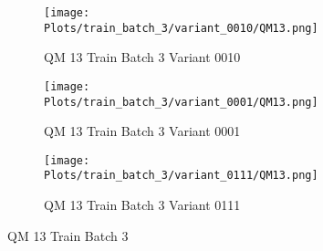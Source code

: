 \documentclass{DissertateFigs}
\begin{document}
\begin{figure}[t!]
\medskip

    \begin{subfigure}{0.47\textwidth}
    \texttt{[image: Plots/train\_batch\_3/variant\_0010/QM13.png]}
    \caption{QM 13 Train Batch 3 Variant 0010}
    \end{subfigure}
    \begin{subfigure}{0.47\textwidth}
    \texttt{[image: Plots/train\_batch\_3/variant\_0001/QM13.png]}
    \caption{QM 13 Train Batch 3 Variant 0001}
    \end{subfigure}

\medskip

    \begin{subfigure}{0.47\textwidth}
    \texttt{[image: Plots/train\_batch\_3/variant\_0111/QM13.png]}
    \caption{QM 13 Train Batch 3 Variant 0111}
    \end{subfigure}
\caption{QM 13 Train Batch 3}
    \end{figure}
\clearpage
\end{document}
